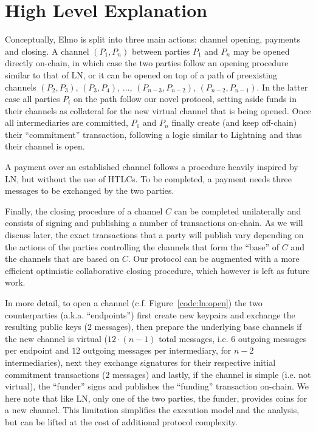 \section{High Level Explanation}
  Conceptually, Elmo is split into three main actions: channel opening,
  payments and closing. A channel $(P_1, P_n)$ between parties $P_1$ and $P_n$
  may be opened directly on-chain, in which case the two parties follow an
  opening procedure similar to that of LN, or it can be opened on top of a path
  of preexisting channels $(P_2, P_3)$, $(P_3, P_4)$, $\dots$, $(P_{n-3},
  P_{n-2})$, $(P_{n-2}, P_{n-1})$. In the latter case all parties $P_i$ on the
  path follow our novel protocol, setting aside funds in their channels as
  collateral for the new virtual channel that is being opened. Once all
  intermediaries are committed, $P_1$ and $P_n$ finally create (and keep
  off-chain) their ``commitment'' transaction, following a logic similar to
  Lightning and thus their channel is open.

  A payment over an established channel follows a procedure heavily inspired by
  LN, but without the use of HTLCs. To be completed, a payment needs three
  messages to be exchanged by the two parties.

  Finally, the closing procedure of a channel $C$ can be completed unilaterally
  and consists of signing and publishing a number of transactions on-chain. As
  we will discuss later, the exact transactions that a party will publish vary
  depending on the actions of the parties controlling the channels that form the
  ``base'' of $C$ and the channels that are based on $C$. Our protocol can be
  augmented with a more efficient optimistic collaborative closing procedure,
  which however is left as future work.

  In more detail, to open a channel (c.f. Figure~\ref{code:ln:open}) the two
  counterparties (a.k.a. ``endpoints'') first create new keypairs and exchange
  the resulting public keys ($2$ messages), then prepare the underlying base
  channels if the new channel is virtual ($12 \cdot (n-1)$ total messages, i.e.
  $6$ outgoing messages per endpoint and $12$ outgoing messages per
  intermediary, for $n-2$ intermediaries), next they exchange signatures for
  their respective initial commitment transactions ($2$ messages) and lastly, if
  the channel is simple (i.e. not virtual), the ``funder'' signs and publishes
  the ``funding'' transaction on-chain.  We here note that like LN, only one of
  the two parties, the funder, provides coins for a new channel.  This
  limitation simplifies the execution model and the analysis, but can be lifted
  at the cost of additional protocol complexity.

